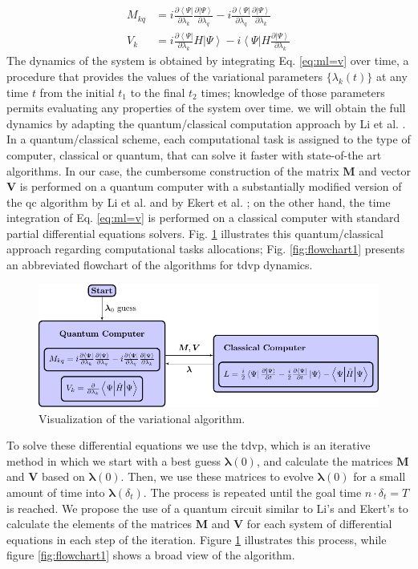 \documentclass{aux/ttuthes2007}
\newcommand{\bra}[1]{\ensuremath{\left\langle#1\right\vert}}
\newcommand{\ket}[1]{\ensuremath{\left|#1\right\rangle}}
\newcommand{\kpp}[1]{\frac{\partial \ket\Psi}{\partial #1}}
\newcommand{\bpp}[1]{\frac{\partial \bra\Psi}{\partial #1}}
\begin{document}
%
\begin{equation*}
	\begin{split}
		M_{kq} &= i\bpp{\lambda_k} \kpp{\lambda_q} - i\bpp{\lambda_q} \kpp{\lambda_k} \\
		V_{k} &= i\bpp{\lambda_k} H \ket \Psi - i\bra \Psi H \kpp{\lambda_k} 
	\end{split}
\end{equation*}
%
The dynamics of the system is obtained by integrating Eq. \ref{eq:ml=v} over time, a procedure that provides the values of the variational parameters $\{\lambda_k(t)\}$ at any time $t$ from the initial $t_1$ to the final $t_2$ times;
knowledge of those parameters permits evaluating any properties of the system over time.
we will obtain the full dynamics by adapting the quantum/classical computation approach by Li et al. .
In a quantum/classical scheme, each computational task is assigned to the type of computer, classical or quantum, that can solve it faster with state-of-the art algorithms.
In our case, the cumbersome construction of the matrix $\bm M$ and vector $\bm V$ is performed on a quantum computer with a substantially modified version of the \gls{qc} algorithm by Li et al.  and by Ekert et al. ;
on the other hand, the time integration of Eq. \ref{eq:ml=v} is performed on a classical computer with standard partial differential equations solvers.
Fig. \ref{fig:TDVP} illustrates this quantum/classical approach regarding computational tasks allocations;
Fig. \ref{fig:flowchart1} presents an abbreviated flowchart of the algorithms for \gls{tdvp} dynamics.
%
\begin{figure}
	\centering
  \includegraphics[width=\linewidth]{img/variation_figure.pdf}
  \caption{Visualization of the variational algorithm.}
  \label{fig:TDVP}
\end{figure}
%
To solve these differential equations we use the \gls{tdvp}, which is an iterative method in which we start with a best guess $\bm \lambda(0)$, and calculate the matrices $\bm M$ and $\bm V$ based on $\bm \lambda(0)$.
Then, we use these matrices to evolve $\bm \lambda(0)$ for a small amount of time into $\bm \lambda(\delta_t)$.
The process is repeated until the goal time $n\cdot\delta_t = T$ is reached.
We propose the use of a quantum circuit similar to Li's \cite{benjamin} and Ekert's  to calculate the elements of the matrices $\bm M$ and $\bm V$ for each system of differential equations in each step of the iteration.
Figure \ref{fig:TDVP} illustrates this process, while figure \ref{fig:flowchart1} shows a broad view of the algorithm.
\end{document}
